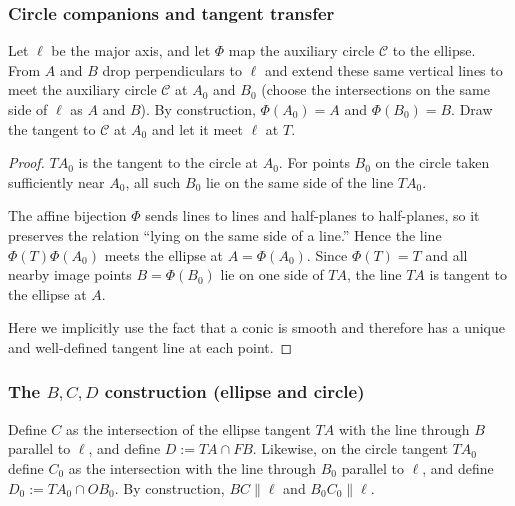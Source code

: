\subsubsection{Circle companions and tangent transfer}

Let $\ell$ be the major axis, and let $\Phi$ map the auxiliary circle $\mathcal{C}$ to the ellipse. From $A$ and $B$ drop perpendiculars to $\ell$ and extend these same vertical lines to meet the auxiliary circle $\mathcal C$ at $A_0$ and $B_0$ (choose the intersections on the same side of $\ell$ as $A$ and $B$). By construction, $\Phi(A_0)=A$ and $\Phi(B_0)=B$.
Draw the tangent to $\mathcal C$ at $A_0$ and let it meet $\ell$ at $T$.

\begin{proof}
  $TA_0$ is the tangent to the circle at $A_0$. For points $B_0$ on the circle taken sufficiently near $A_0$, all such $B_0$ lie on the same side of the line $TA_0$.

  The affine bijection $\Phi$ sends lines to lines and half-planes to half-planes, so it preserves the relation ``lying on the same side of a line.'' Hence the line $\Phi(T)\Phi(A_0)$ meets the ellipse at $A=\Phi(A_0)$. Since $\Phi(T)=T$ and all nearby image points $B=\Phi(B_0)$ lie on one side of $TA$, the line $TA$ is tangent to the ellipse at $A$.

  Here we implicitly use the fact that a conic is smooth and therefore has a unique and well-defined tangent line at each point.\qedhere
\end{proof}

\subsubsection{The \texorpdfstring{$B,C,D$}{B,C,D} construction (ellipse and circle)}

Define $C$ as the intersection of the ellipse tangent $TA$ with the line through $B$ parallel to $\ell$, and define $D:=TA\cap FB$. Likewise, on the circle tangent $TA_0$ define $C_0$ as the intersection with the line through $B_0$ parallel to $\ell$, and define $D_0:=TA_0\cap OB_0$. By construction, $BC\parallel\ell$ and $B_0C_0\parallel\ell$.

